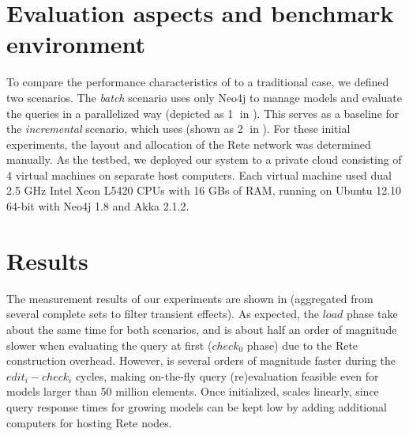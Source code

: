 \label{benchmark_environment}
\section{Evaluation aspects and benchmark environment}

To compare the performance characteristics of \iqd{} to a traditional case, we defined two scenarios. The \textit{batch} scenario uses only Neo4j to manage models and evaluate the queries in a parallelized way (depicted as \textcircled{1} in ). This serves as a baseline for the \textit{incremental} scenario, which uses \iqd{} (shown as \textcircled{2} in ). For these initial experiments, the layout and allocation of the Rete network was determined manually. As the testbed, we deployed our system to a private cloud consisting of 4 virtual machines on separate host computers. Each virtual machine used dual 2.5 GHz Intel Xeon L5420 CPUs with 16 GBs of RAM, running on Ubuntu 12.10 64-bit with Neo4j 1.8 and Akka 2.1.2.

\section{Results}
\label{benchmark_results}\label{analysis}

The measurement results of our experiments are shown in  (aggregated from several complete sets to filter transient effects). As expected, the $\mathit{load}$ phase take about the same time for both scenarios, and \iqd{} is about half an order of magnitude slower when evaluating the query at first ($\mathit{check}_0$ phase) due to the Rete construction overhead. However, \iqd{} is several orders of magnitude faster during the $\mathit{edit}_i-\mathit{check}_i$ cycles, making on-the-fly query (re)evaluation feasible even for models larger than 50 million elements. Once initialized, \iqd{} scales linearly, since query response times for growing models can be kept low by adding additional computers for hosting Rete nodes.








